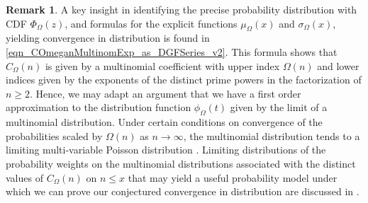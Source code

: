 \documentclass[11pt,reqno,a4letter]{article}
\numberwithin{equation}{section}
\numberwithin{figure}{section}
\numberwithin{table}{section}
\let\citep\cite
\newcommand{\cf}{\textit{cf.\ }}
\theoremstyle{plain}
\numberwithin{theorem}{section}
\theoremstyle{definition}
\newtheorem{remark}[theorem]{Remark}
\begin{document}
\begin{remark}
A key insight in identifying the precise probability distribution with 
CDF $\Phi_{\Omega}(z)$, and 
formulas for the explicit functions $\mu_{\Omega}(x)$ and $\sigma_{\Omega}(x)$, yielding 
convergence in distribution is found in \eqref{eqn_COmeganMultinomExp_as_DGFSeries_v2}. 
This formula shows that $C_{\Omega}(n)$ is given by a multinomial coefficient with 
upper index $\Omega(n)$ and lower indices given by the exponents of the distinct prime powers 
in the factorization of $n \geq 2$. Hence, we may adapt an argument that 
we have a first order approximation to the distribution function $\phi_{\Omega}(t)$
given by the limit of a multinomial distribution. 
Under certain conditions on convergence of the 
probabilities scaled by $\Omega(n)$ as $n \rightarrow \infty$, 
the multinomial distribution tends to a limiting multi-variable Poisson distribution 
\cite{DEHEUVELS198865}. 
Limiting distributions of the probability weights on the multinomial distributions associated 
with the distinct values of $C_{\Omega}(n)$ on $n \leq x$ that may yield a useful probability 
model under which we can prove our conjectured convergence in distribution are discussed in 
\citep[\cf \S 1.2]{LOG-COMB-STRUCTS-BOOK}. 
\end{remark}
\end{document}

